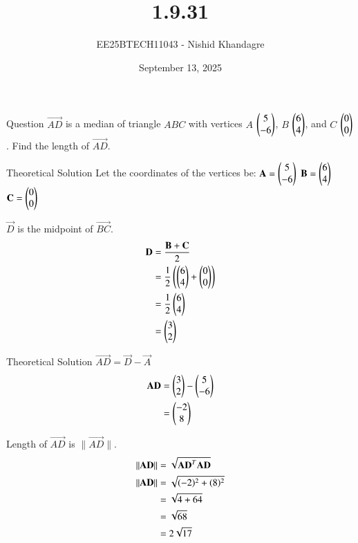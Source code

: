\documentclass{beamer}
\title
{1.9.31}
\date{September 13, 2025}
\author
{EE25BTECH11043 - Nishid Khandagre}
\begin{document}
\frame{\titlepage}

\begin{frame}{Question}
$\vec{AD}$ is a median of triangle $ABC$ with vertices $A$ $\begin{pmatrix} 5\\-6\end{pmatrix}$, $B$ $\begin{pmatrix} 6\\4 \end{pmatrix}$, and $C$ $\begin{pmatrix} 0\\0 \end{pmatrix}$. Find the length of $\vec{AD}$.
\end{frame}


\begin{frame}{Theoretical Solution}
Let the coordinates of the vertices be:
$\mathbf{A} = \begin{pmatrix}5 \\ -6\end{pmatrix}$
$\mathbf{B} = \begin{pmatrix}6 \\ 4\end{pmatrix}$
$\mathbf{C} = \begin{pmatrix}0 \\ 0\end{pmatrix}$

$\vec{D}$ is the midpoint of $\vec{BC}$.
\begin{align}
\mathbf{D} &= \frac{\mathbf{B} + \mathbf{C}}{2} \\
&= \frac{1}{2}\left(\begin{pmatrix}6 \\ 4\end{pmatrix} + \begin{pmatrix}0 \\ 0\end{pmatrix}\right) \\
&= \frac{1}{2}\begin{pmatrix}6 \\ 4\end{pmatrix} \\
&= \begin{pmatrix}3 \\ 2\end{pmatrix}
\end{align}
\end{frame}

\begin{frame}{Theoretical Solution}
$\vec{AD} = \vec{D} - \vec{A}$
\begin{align}
\mathbf{AD} &= \begin{pmatrix}3 \\ 2\end{pmatrix} - \begin{pmatrix}5 \\ -6\end{pmatrix} \\
&= \begin{pmatrix}-2 \\ 8\end{pmatrix}
\end{align}

Length of $\vec{AD}$ is $\|\vec{AD}\|$.
\begin{align}
\left\lVert\mathbf{AD}\right\rVert &= \sqrt{\mathbf{AD}^T\mathbf{AD}}\\
\left\lVert\mathbf{AD}\right\rVert &= \sqrt{(-2)^2 + (8)^2} \\
&= \sqrt{4 + 64} \\
&= \sqrt{68} \\
&= 2\sqrt{17}
\end{align}
\end{frame}
\end{document}
